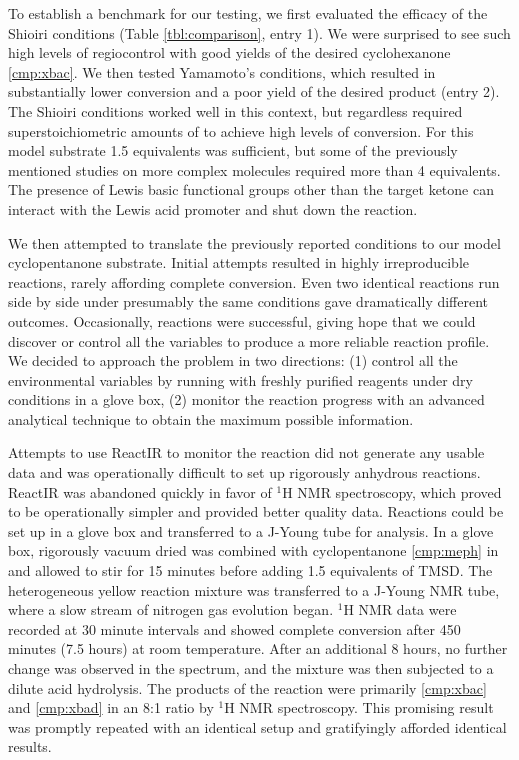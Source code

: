 To establish a benchmark for our testing, we first evaluated the efficacy of the
Shioiri conditions (Table \ref{tbl:comparison}, entry 1).
We were surprised to see such high levels of regiocontrol with good yields of
the desired cyclohexanone \ref{cmp:xbac}. We then tested
Yamamoto's conditions, which resulted in substantially
lower conversion and a poor yield of the desired product (entry 2). The Shioiri
conditions worked well in this context, but regardless required
superstoichiometric amounts of  to achieve high levels of
conversion. For this model substrate 1.5 equivalents was sufficient, but some
of the previously mentioned studies on more complex molecules required more than 4 equivalents. The
presence of Lewis basic functional groups other than the target ketone can interact with the Lewis
acid promoter and shut down the reaction. 

We then attempted to translate the previously reported conditions to our model
cyclopentanone substrate. Initial attempts resulted in highly irreproducible
reactions, rarely affording complete conversion. Even two identical reactions
run side by side under presumably the same conditions gave dramatically
different outcomes. Occasionally, reactions were successful, giving hope that
we could discover or control all the variables to produce a more reliable
reaction profile. We decided to approach the problem in two directions: (1) control all the
environmental variables by running with freshly purified reagents under dry conditions in a glove box, (2) monitor the reaction progress with an advanced analytical
technique to obtain the maximum possible information. 

Attempts to use ReactIR to monitor the reaction did not generate any usable data
and was operationally difficult to set up rigorously anhydrous reactions. ReactIR was abandoned
quickly in favor of $^1$H NMR spectroscopy, which proved to be operationally simpler and provided better
quality data. Reactions could be set up in a glove box and transferred to a J-Young tube
for analysis. In a glove box, rigorously vacuum dried  was combined with cyclopentanone 
\ref{cmp:meph} in  and allowed to stir for 15 minutes before adding 1.5 equivalents of
TMSD. The heterogeneous yellow reaction mixture was transferred to a J-Young NMR
tube, where a slow stream of nitrogen gas evolution began. $^1$H NMR data were recorded at
30 minute intervals and showed complete conversion after 450 minutes (7.5 hours)
at room temperature. After an additional 8 hours, no further
change was observed in the spectrum, and the mixture was then subjected to a dilute
acid hydrolysis. The products of the reaction were primarily
\ref{cmp:xbac} and \ref{cmp:xbad} in an 8:1 ratio by $^1$H NMR
spectroscopy. This promising result was promptly repeated with an identical
setup and gratifyingly afforded identical results. 

